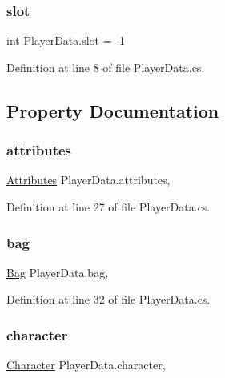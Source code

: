 \subsubsection{\texorpdfstring{slot}{slot}}
{\footnotesize\ttfamily int Player\+Data.\+slot = -\/1}



Definition at line 8 of file Player\+Data.\+cs.



\subsection{Property Documentation}
\mbox{\label{class_player_data_a0cb768b809c4518326a7f5092ef6fb76}} 
\subsubsection{\texorpdfstring{attributes}{attributes}}
{\footnotesize\ttfamily \mbox{\hyperlink{class_attributes}{Attributes}} Player\+Data.\+attributes\hspace{0.3cm}{\ttfamily [get]}, {\ttfamily [set]}}



Definition at line 27 of file Player\+Data.\+cs.

\mbox{\label{class_player_data_a30f64ffcbf5541044cadb3e5b038acb7}} 
\subsubsection{\texorpdfstring{bag}{bag}}
{\footnotesize\ttfamily \mbox{\hyperlink{class_bag}{Bag}} Player\+Data.\+bag\hspace{0.3cm}{\ttfamily [get]}, {\ttfamily [set]}}



Definition at line 32 of file Player\+Data.\+cs.

\mbox{\label{class_player_data_a15faab09286a8d43714c7659a9d1b6bd}} 
\subsubsection{\texorpdfstring{character}{character}}
{\footnotesize\ttfamily \mbox{\hyperlink{class_character}{Character}} Player\+Data.\+character\hspace{0.3cm}{\ttfamily [get]}, {\ttfamily [set]}}



